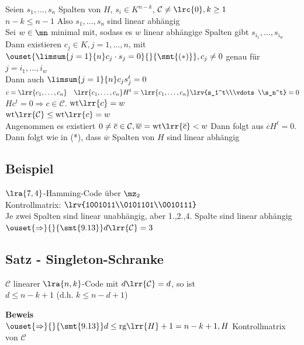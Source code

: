 		Seien $s_1,\dots,s_n$ Spalten von $H$, $s_i\in K^{n-k}$, $\mathcal{C}\neq\lrc{0}, k\geq 1$\\
		$n-k\leq n-1$ Also $s_1,\dots,s_n$ sind linear abhängig\\
		Sei $w\in\mn$ minimal mit, sodass es $w$ linear abhängige Spalten gibt $s_{i_1},\dots,s_{i_w}$\\
		Dann existieren $c_j\in K, j=1,\dots,n$, mit $\ouset{\limsum{j=1}{n}c_j\cdot s_j=0}{}{\smt{(*)}}, c_j\neq 0$ genau für $j=i_1,\dots,i_w$\\
		Dann auch $\limsum{j=1}{n}c_js_j^t=0$\\
		$c=\lrr{c_1,\dots,c_n}\quad \lrr{c_1,\dots,c_n}H^t=\lrr{c_1,\dots,c_n}\lrv{s_1^t\\\vdots\\s_n^t}=0$\\
		$Hc^t=0\Rightarrow c\in\mathcal{C}$. $\mbox{wt}\lrr{c}=w$\\
		$\mbox{wt}\lrr{\mathcal{C}}\leq\mbox{wt}\lrr{c}=w$\\
		Angenommen es existiert $0\neq\overline{c}\in\mathcal{C}, \overline{w}=\mbox{wt}\lrr{\overline{c}}<w$ Dann folgt aus $\overline{c}H^t=0$. Dann folgt wie in (*), dass $\overline{w}$ Spalten von $H$ sind linear abhängig \lightning

	\subsection{Beispiel}
		$\lra{7,4}$-Hamming-Code über $\mz_2$\\
		Kontrollmatrix: $\lrv{1001011\\0101101\\0010111}$\\
		Je zwei Spalten sind linear unabhängig, aber 1.,2.,4. Spalte sind linear abhängig\\
		$\ouset{\Rightarrow}{}{\smt{9.13}} d\lrr{\mathcal{C}}=3$

	\subsection{Satz - Singleton-Schranke}
		$\mathcal{C}$ linearer $\lra{n,k}$-Code mit $d\lrr{\mathcal{C}}=d$, so ist\\
		$d\leq n-k+1$ (d.h. $k\leq n-d+1$)

		\textbf{Beweis}\\
		$\ouset{\Rightarrow}{}{\smt{9.13}} d\leq\mbox{rg}\lrr{H}+1=n-k+1, H$ Kontrollmatrix von $\mathcal{C}$
	
